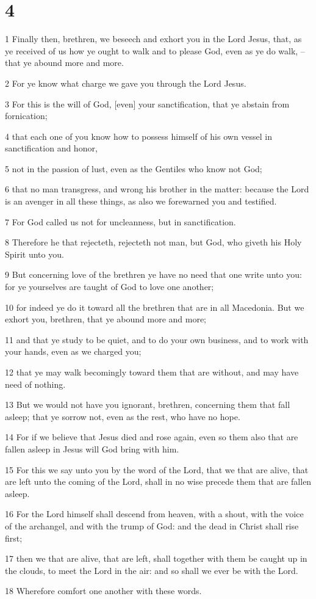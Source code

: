 \chapter{4}

\par 1 Finally then, brethren, we beseech and exhort you in the Lord Jesus, that, as ye received of us how ye ought to walk and to please God, even as ye do walk, --that ye abound more and more.
\par 2 For ye know what charge we gave you through the Lord Jesus.
\par 3 For this is the will of God, [even] your sanctification, that ye abstain from fornication;
\par 4 that each one of you know how to possess himself of his own vessel in sanctification and honor,
\par 5 not in the passion of lust, even as the Gentiles who know not God;
\par 6 that no man transgress, and wrong his brother in the matter: because the Lord is an avenger in all these things, as also we forewarned you and testified.
\par 7 For God called us not for uncleanness, but in sanctification.
\par 8 Therefore he that rejecteth, rejecteth not man, but God, who giveth his Holy Spirit unto you.
\par 9 But concerning love of the brethren ye have no need that one write unto you: for ye yourselves are taught of God to love one another;
\par 10 for indeed ye do it toward all the brethren that are in all Macedonia. But we exhort you, brethren, that ye abound more and more;
\par 11 and that ye study to be quiet, and to do your own business, and to work with your hands, even as we charged you;
\par 12 that ye may walk becomingly toward them that are without, and may have need of nothing.
\par 13 But we would not have you ignorant, brethren, concerning them that fall asleep; that ye sorrow not, even as the rest, who have no hope.
\par 14 For if we believe that Jesus died and rose again, even so them also that are fallen asleep in Jesus will God bring with him.
\par 15 For this we say unto you by the word of the Lord, that we that are alive, that are left unto the coming of the Lord, shall in no wise precede them that are fallen asleep.
\par 16 For the Lord himself shall descend from heaven, with a shout, with the voice of the archangel, and with the trump of God: and the dead in Christ shall rise first;
\par 17 then we that are alive, that are left, shall together with them be caught up in the clouds, to meet the Lord in the air: and so shall we ever be with the Lord.
\par 18 Wherefore comfort one another with these words.

